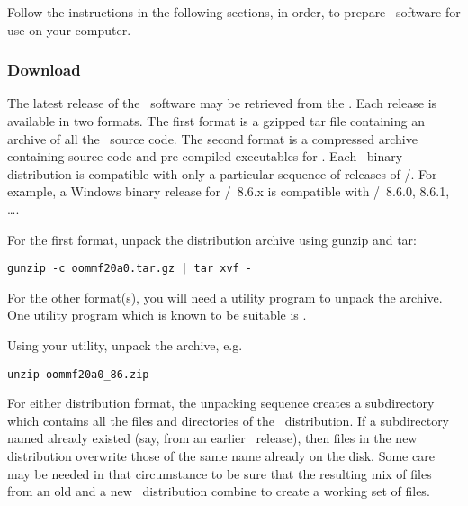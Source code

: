 Follow the instructions in the following sections, in order,
to prepare \OOMMF\ software for use on your computer.

\subsubsection{Download}

The latest release of the \OOMMF\ software may be retrieved from the
.  Each release is
available in two formats.  The first format is a gzipped tar file
containing an archive of all the \OOMMF\ source code.  The second format
is a  compressed archive containing source code and
pre-compiled executables for \Windows.  Each \Windows\ binary
distribution is compatible with only a particular sequence of releases
of \Tcl/\Tk.  For example, a Windows binary release for \Tcl/\Tk\ 8.6.x
is compatible with \Tcl/\Tk\ 8.6.0, 8.6.1, \ldots.  

For the first format, unpack the distribution archive using gunzip and
tar:
\begin{verbatim}
gunzip -c oommf20a0.tar.gz | tar xvf -
\end{verbatim}

For the other format(s), you will need a utility program to unpack the
 archive.  
One utility program which is known to be suitable is
.

Using your utility, unpack the  archive, e.g.
\begin{verbatim}
unzip oommf20a0_86.zip
\end{verbatim}

For either distribution format, the unpacking sequence creates a
subdirectory  which contains all the files and directories
of the \OOMMF\ distribution.  If a subdirectory named 
already existed (say, from an earlier \OOMMF\ release), then
files in the new distribution overwrite those of the same name already
on the disk.  Some care may be needed in that circumstance to be
sure that the resulting mix of files from an old and a new 
\OOMMF\ distribution combine to create a working set of files.

